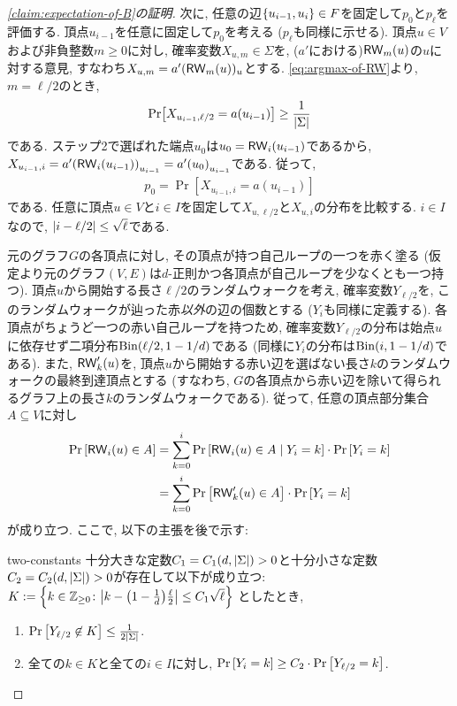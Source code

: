 \begin{proof}[\cref{claim:expectation-of-B}の証明]
  次に, 任意の辺$\qty{u_{i-1},u_i}\in F$を固定して$p_0$と$p_\ell$を評価する.
  頂点$u_{i-1}$を任意に固定して$p_0$を考える ($p_\ell$も同様に示せる).
  頂点$u\in V$および非負整数$m\ge 0$に対し, 確率変数$X_{u,m}\in\Sigma$を, ($a'$における)$\mathsf{RW}_m(u)$の$u$に対する意見, すなわち$X_{u,m} = a'(\mathsf{RW}_m(u))_u$とする.
  \cref{eq:argmax-of-RW}より, $m=\ell/2$のとき, 
  \begin{align}
  \Pr[X_{u_{i-1},\ell/2} = a(u_{i-1})] \ge \frac{1}{\abs{\Sigma}} \label{eq:center_opinion}
  \end{align}
  である.
  ステップ2で選ばれた端点$u_0$は$u_0=\mathsf{RW}_i(u_{i-1})$であるから, $X_{u_{i-1},i}=a'\qty( \mathsf{RW}_i(u_{i-1}) )_{u_{i-1}} = a'\qty(u_0)_{u_{i-1}}$である.
  従って, 
  \begin{align}
    p_0 = \Pr[X_{u_{i-1},i} = a(u_{i-1})] \label{eq:p_0}
  \end{align}
  である. 任意に頂点$u\in V$と$i\in I$を固定して$X_{u,\ell/2}$と$X_{u,i}$の分布を比較する.
  $i\in I$なので, $\abs{i-\ell/2} \le \sqrt{\ell}$である.

  元のグラフ$G$の各頂点に対し, その頂点が持つ自己ループの一つを赤く塗る
  (仮定より元のグラフ$(V,E)$は$d$-正則かつ各頂点が自己ループを少なくとも一つ持つ).
  頂点$u$から開始する長さ$\ell/2$のランダムウォークを考え,
  確率変数$Y_{\ell/2}$を, このランダムウォークが辿った赤\emph{以外}の辺の個数とする ($Y_i$も同様に定義する).
  各頂点がちょうど一つの赤い自己ループを持つため,
  確率変数$Y_{\ell/2}$の分布は始点$u$に依存せず二項分布$\mathrm{Bin}(\ell/2,1-1/d)$である (同様に$Y_i$の分布は$\mathrm{Bin}(i,1-1/d)$である).
  また, $\mathsf{RW}'_k(u)$を, 頂点$u$から開始する赤い辺を選ばない長さ$k$のランダムウォークの最終到達頂点とする (すなわち, $G$の各頂点から赤い辺を除いて得られるグラフ上の長さ$k$のランダムウォークである).
  従って, 任意の頂点部分集合$A\subseteq V$に対し
  \begin{align}
    \Pr\qty[\mathsf{RW}_{i}(u)\in A] &= \sum_{k=0}^{i} \Pr\qty[\mathsf{RW}_{i}(u) \in A \;\middle\vert\; Y_{i}=k] \cdot \Pr\qty[Y_{i}=k] \nonumber \\
    &= \sum_{k=0}^{i} \Pr\qty[\mathsf{RW}'_k(u) \in A] \cdot \Pr\qty[Y_{i}=k] \label{eq:RW_i_distribution}
  \end{align}
  が成り立つ.
  ここで, 以下の主張を後で示す:
  \begin{claim}{}{two-constants}
  十分大きな定数$C_1=C_1(d,\abs{\Sigma})>0$と十分小さな定数$C_2=C_2(d,\abs{\Sigma})>0$が存在して以下が成り立つ:
  $K:= \qty{ k\in \mathbb{Z}_{\ge 0} \colon \abs{k - \qty(1-\frac{1}{d})\frac{\ell}{2}} \le C_1\sqrt{\ell} }$ としたとき,
  \begin{enumerate}
    \item $\Pr\qty[Y_{\ell/2} \not\in K] \le \frac{1}{2\abs{\Sigma}}$.
    \item 全ての$k\in K$と全ての$i\in I$に対し, $\Pr\qty[Y_i=k] \ge C_2\cdot \Pr\qty[Y_{\ell/2}=k]$.
  \end{enumerate}
  \end{claim}
  

\end{proof}
